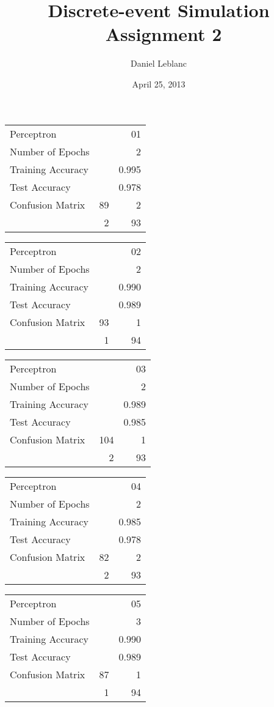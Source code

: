 \documentclass[11pt,twocolumn]{article}
\author{Daniel Leblanc}
\title{Discrete-event Simulation \ Assignment 2}
\date{April 25, 2013}
\begin{document}
\maketitle
\begin{center}
\begin{tabular}{l | r r}
Perceptron &&01\\
Number of Epochs & &2\\
Training Accuracy & &0.995\\
Test Accuracy & &0.978\\
Confusion Matrix &89 & 2\\
 &2 & 93\\
\end{tabular}
\end{center}
\begin{center}
\begin{tabular}{l | r r}
Perceptron &&02\\
Number of Epochs & &2\\
Training Accuracy & &0.990\\
Test Accuracy & &0.989\\
Confusion Matrix &93 & 1\\
 &1 & 94\\
\end{tabular}
\end{center}
\begin{center}
\begin{tabular}{l | r r}
Perceptron &&03\\
Number of Epochs & &2\\
Training Accuracy & &0.989\\
Test Accuracy & &0.985\\
Confusion Matrix &104 & 1\\
 &2 & 93\\
\end{tabular}
\end{center}
\begin{center}
\begin{tabular}{l | r r}
Perceptron &&04\\
Number of Epochs & &2\\
Training Accuracy & &0.985\\
Test Accuracy & &0.978\\
Confusion Matrix &82 & 2\\
 &2 & 93\\
\end{tabular}
\end{center}
\begin{center}
\begin{tabular}{l | r r}
Perceptron &&05\\
Number of Epochs & &3\\
Training Accuracy & &0.990\\
Test Accuracy & &0.989\\
Confusion Matrix &87 & 1\\
 &1 & 94\\
\end{tabular}
\end{center}
\end{document}

